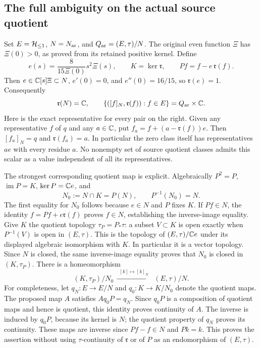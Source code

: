 \subsection{The full ambiguity on the actual source quotient}
Set $E=\mathcal H_{\leq 1}$, $N=N_{\rm ar}$, and $Q_{\rm ar}=(E,\tau)/N$.
The original even function $\Xi$ has $\Xi(0)>0$, as proved
from its retained positive kernel. Define
\begin{equation}
 e(s)=\frac{8}{15\Xi(0)}s^2\Xi(s),\qquad
 K=\ker\mathfrak r,\qquad P f=f-e\,\mathfrak r(f).
 \label{eq:cq-residue-section}
\end{equation}
Then $e\in\mathbb C[s]\Xi\subset N$, $e'(0)=0$, and
$e''(0)=16/15$, so $\mathfrak r(e)=1$.
Consequently
\begin{equation}
 \mathfrak r(N)=\mathbb C,\qquad
 \{([f]_N,\mathfrak r(f)):f\in E\}
       =Q_{\rm ar}\times\mathbb C .
 \label{eq:cq-source-residue-full-ambiguity}
\end{equation}
Here is the exact representative for every pair on the right.
Given any representative $f$ of $q$ and any $a\in\mathbb C$, put
$f_a=f+(a-\mathfrak r(f))e$. Then $[f_a]_N=q$ and
$\mathfrak r(f_a)=a$. In particular the zero class itself has
representatives $ae$ with every residue $a$. No nonempty set of
source quotient classes admits this scalar as a value independent
of all its representatives.

The strongest corresponding quotient map is explicit. Algebraically
$P^2=P$, $\operatorname{im}P=K$, $\ker P=\mathbb C e$, and
\[
 N_0:=N\cap K=P(N),\qquad P^{-1}(N_0)=N .
\]
The first equality for $N_0$ follows because $e\in N$ and
$P$ fixes $K$. If $Pf\in N$, the identity
$f=Pf+e\mathfrak r(f)$ proves $f\in N$, establishing the
inverse-image equality. Give $K$ the quotient topology
$\tau_P=P_*\tau$: a subset $V\subset K$ is open exactly when
$P^{-1}(V)$ is open in $(E,\tau)$. This is the topology of
$(E,\tau)/\mathbb C e$ under its displayed algebraic isomorphism
with $K$. In particular it is a vector topology. Since $N$ is
closed, the same inverse-image equality proves that $N_0$ is
closed in $(K,\tau_P)$. There is a homeomorphism
\begin{equation}
 (K,\tau_P)/N_0
    \ \xrightarrow{\ \ [k]\mapsto[k]_N\ \ }\
    (E,\tau)/N .
 \label{eq:cq-source-residue-reduced-quotient}
\end{equation}
For completeness, let $q_N:E\to E/N$ and
$q_0:K\to K/N_0$ denote the quotient maps. The proposed map
$A$ satisfies $Aq_0P=q_N$. Since $q_0P$ is a composition
of quotient maps and hence is quotient, this identity proves
continuity of $A$. The inverse is induced by $q_0P$, because
its kernel is $N$; the quotient property of $q_N$ proves its
continuity. These maps are inverse since
$P f-f\in N$ and $P k=k$. This proves the assertion without
using $\tau$-continuity of $\mathfrak r$ or of $P$ as an
endomorphism of $(E,\tau)$.

